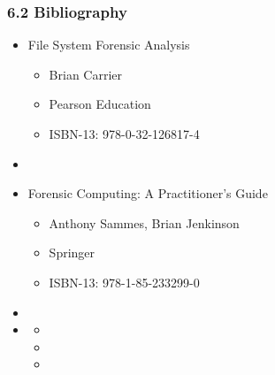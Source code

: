 \begin{frame}
  \frametitle{6.2 Bibliography}
  \begin{itemize}
      \item File System Forensic Analysis
        \begin{itemize}
            \item[] Brian Carrier
            \item[] Pearson Education
            \item[] ISBN-13: 978-0-32-126817-4
        \end{itemize}
      \item[]
      \item Forensic Computing: A Practitioner’s Guide
        \begin{itemize}
            \item[] Anthony Sammes, Brian Jenkinson
            \item[] Springer
            \item[] ISBN-13: 978-1-85-233299-0
        \end{itemize}
      \item[]
      \item[] 
        \begin{itemize}
            \item[]
            \item[]
            \item[] 
        \end{itemize}
  \end{itemize}
\end{frame}


